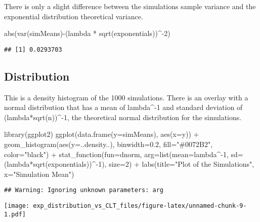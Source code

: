 \documentclass[
]{article}
\newenvironment{Shaded}{\begin{snugshade}}{\end{snugshade}}
\newcommand{\AttributeTok}[1]{\textcolor[rgb]{0.77,0.63,0.00}{#1}}
\newcommand{\DecValTok}[1]{\textcolor[rgb]{0.00,0.00,0.81}{#1}}
\newcommand{\FloatTok}[1]{\textcolor[rgb]{0.00,0.00,0.81}{#1}}
\newcommand{\FunctionTok}[1]{\textcolor[rgb]{0.00,0.00,0.00}{#1}}
\newcommand{\NormalTok}[1]{#1}
\newcommand{\SpecialCharTok}[1]{\textcolor[rgb]{0.00,0.00,0.00}{#1}}
\newcommand{\StringTok}[1]{\textcolor[rgb]{0.31,0.60,0.02}{#1}}
\begin{document}
There is only a slight difference between the simulations sample
variance and the exponential distribution theoretical variance.

\begin{Shaded}
\begin{Highlighting}[]
\FunctionTok{abs}\NormalTok{(}\FunctionTok{var}\NormalTok{(simMeans)}\SpecialCharTok{{-}}\NormalTok{(lambda }\SpecialCharTok{*} \FunctionTok{sqrt}\NormalTok{(exponentials))}\SpecialCharTok{\^{}{-}}\DecValTok{2}\NormalTok{)}
\end{Highlighting}
\end{Shaded}

\begin{verbatim}
## [1] 0.0293703
\end{verbatim}

\hypertarget{distribution}{%
\subsection{Distribution}\label{distribution}}

This is a density histogram of the 1000 simulations. There is an overlay
with a normal distribution that has a mean of lambda\^{}-1 and standard
deviation of (lambda*sqrt(n))\^{}-1, the theoretical normal distribution
for the simulations.

\begin{Shaded}
\begin{Highlighting}[]
\FunctionTok{library}\NormalTok{(ggplot2)}
\FunctionTok{ggplot}\NormalTok{(}\FunctionTok{data.frame}\NormalTok{(}\AttributeTok{y=}\NormalTok{simMeans), }\FunctionTok{aes}\NormalTok{(}\AttributeTok{x=}\NormalTok{y)) }\SpecialCharTok{+} 
  \FunctionTok{geom\_histogram}\NormalTok{(}\FunctionTok{aes}\NormalTok{(}\AttributeTok{y=}\NormalTok{..density..), }\AttributeTok{binwidth=}\FloatTok{0.2}\NormalTok{, }\AttributeTok{fill=}\StringTok{"\#0072B2"}\NormalTok{, }
                 \AttributeTok{color=}\StringTok{"black"}\NormalTok{) }\SpecialCharTok{+}
  \FunctionTok{stat\_function}\NormalTok{(}\AttributeTok{fun=}\NormalTok{dnorm, }\AttributeTok{arg=}\FunctionTok{list}\NormalTok{(}\AttributeTok{mean=}\NormalTok{lambda}\SpecialCharTok{\^{}{-}}\DecValTok{1}\NormalTok{, }
                                    \AttributeTok{sd=}\NormalTok{(lambda}\SpecialCharTok{*}\FunctionTok{sqrt}\NormalTok{(exponentials))}\SpecialCharTok{\^{}{-}}\DecValTok{1}\NormalTok{), }
                \AttributeTok{size=}\DecValTok{2}\NormalTok{) }\SpecialCharTok{+}
  \FunctionTok{labs}\NormalTok{(}\AttributeTok{title=}\StringTok{"Plot of the Simulations"}\NormalTok{, }\AttributeTok{x=}\StringTok{"Simulation Mean"}\NormalTok{)}
\end{Highlighting}
\end{Shaded}

\begin{verbatim}
## Warning: Ignoring unknown parameters: arg
\end{verbatim}

\texttt{[image: exp\_distribution\_vs\_CLT\_files/figure-latex/unnamed-chunk-9-1.pdf]}
\end{document}

